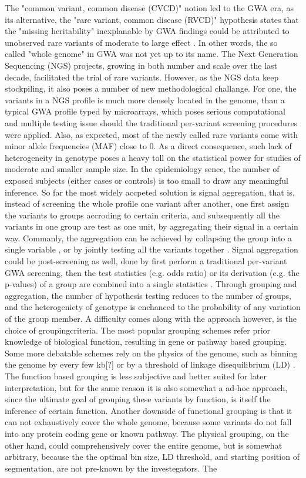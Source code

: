 The "common variant, common disease (CVCD)" notion led to the GWA era, as its alternative, the "rare variant, common disease (RVCD)" hypothesis states that the "missing heritability" inexplanable by GWA findings could be attributed to unobserved rare variants of moderate to large effect \cite{RVCD1}. In other words, the so called "whole genome" in GWA was not yet up to its name. The Next Generation Sequencing (NGS) projects, growing in both number and scale over the last decade, facilitated the trial of rare variants. However, as the NGS data keep stockpiling, it also poses a number of new methodological challange. For one, the variants in a NGS profile is much more densely located in the genome, than a typical GWA profile typed by microarrays, which poses serious computational and multiple testing issue should the traditional per-variant screening procedures were applied. Also, as expected, most of the newly called rare variants come with minor allele frequencies (MAF) close to 0. As a direct consequence, such lack of heterogeneity in genotype poses a heavy toll on the statistical power for studies of moderate and smaller sample size. In the epidemiology sence, the number of exposed subjects (either cases or controls) is too small to draw any meaningful inference. So far the most widely accpeted solution is signal aggregation, that is, instead of screening the whole profile one variant after another, one first assign the variants to groups accroding to certain criteria, and subsequently all the variants in one group are test as one unit, by aggregating their signal in a certain way. Commanly, the aggregation can be achieved by collapsing the group into a single variable \cite{Burden1}, or by jointly testing all the variants together \cite{HWU, SKT}. Signal aggregation could be post-screening as well, done by first perform a traditional per-variant GWA screening, then the test statistics (e.g. odds ratio) or its derivation (e.g. the p-values) of a group are combined into a single statistics \cite{Dai:2015, plink1}. Through grouping and aggregation, the number of hypothesis testing reduces to the number of groups, and the heterogeniety of genotype is enchanced to the probability of any variation of the group member. A difficulty comes along with the approach however, is the choice of groupingcriteria. The most popular grouping schemes refer prior knowledge of biological function, resulting in gene or pathway based grouping. Some more debatable schemes rely on the physics of the genome, such as binning the genome by every few kb[?] or by a threshold of linkage disequilibrium (LD) \cite{plink1}. The function based grouping is less subjective and better suited for later interpretation, but for the same reason it is also somewhat a ad-hoc approach, since the ultimate goal of grouping these variants by function, is itself the inference of certain function. Another downside of functional grouping is that it can not exhaustively cover the whole genome, because some variants do not fall into any protein coding gene or known pathway. The physical grouping, on the other hand, could comprehensively cover the entire genome, but is somewhat arbitrary, because the the optimal bin size, LD threshold, and starting position of segmentation, are not pre-known by the investegators. The 